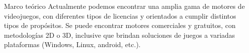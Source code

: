 \begin{thesischapter}{1} {Marco teórico}
    Actualmente podemos encontrar una amplia gama de motores de videojuegos, con diferentes tipos de
    licencias y orientados a cumplir distintos tipos de propósitos. Se puede encontrar motores comerciales
    y gratuitos, con metodologías 2D o 3D, inclusive que brindan soluciones de juegos a variadas
    plataformas (Windows, Linux, android, etc.).\\ 
    

\end{thesischapter}

